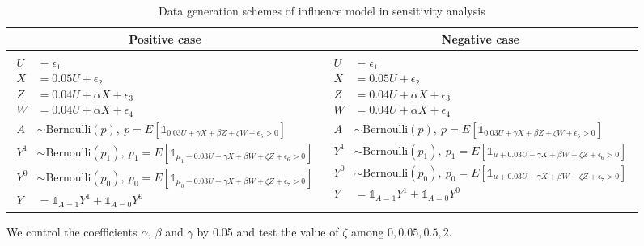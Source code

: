 \begin{table}[htbp]
    \centering
    \begin{tabular}{c|c}
        Positive case & Negative case \\
        \hline \\
        $\begin{aligned}
            U &= \epsilon_1 \\
            X &= 0.05U + \epsilon_2 \\
            Z &= 0.04U + \alpha X + \epsilon_3 \\
            W &= 0.04U + \alpha X + \epsilon_4 \\
            A &\sim \text{Bernoulli}(p),\ p=E[\mathds{1}_{0.03U + \gamma X + \beta Z + \zeta W + \epsilon_5 >0}] \\
            Y^1&\sim \text{Bernoulli}(p_1),\ p_1=E[\mathds{1}_{\mu_1 + 0.03U + \gamma X + \beta W + \zeta Z + \epsilon_6 > 0}] \\
            Y^0&\sim \text{Bernoulli}(p_0),\ p_0=E[\mathds{1}_{\mu_0 + 0.03U + \gamma X + \beta W + \zeta Z + \epsilon_7 > 0}] \\
            Y &= \mathds{1}_{A=1}Y^1 + \mathds{1}_{A=0}Y^0 
        \end{aligned}$ & 
        $\begin{aligned}
            U &= \epsilon_1 \\
            X &= 0.05U + \epsilon_2 \\
            Z &= 0.04U + \alpha X + \epsilon_3 \\
            W &= 0.04U + \alpha X + \epsilon_4 \\
            A &\sim \text{Bernoulli}(p),\ p=E[\mathds{1}_{0.03U + \gamma X + \beta Z + \zeta W + \epsilon_5 >0}] \\
            Y^1&\sim \text{Bernoulli}(p_1),\ p_1=E[\mathds{1}_{\mu + 0.03U + \gamma X + \beta W + \zeta Z + \epsilon_6 > 0}] \\
            Y^0&\sim \text{Bernoulli}(p_0),\ p_0=E[\mathds{1}_{\mu + 0.03U + \gamma X + \beta W + \zeta Z + \epsilon_7 > 0}] \\
            Y &= \mathds{1}_{A=1}Y^1 + \mathds{1}_{A=0}Y^0 
        \end{aligned}$
    \end{tabular}
    \caption{\centering Data generation schemes of influence model in sensitivity analysis}
    \label{tab: est_datageneration}
\end{table}

We control the coefficients $\alpha$, $\beta$ and $\gamma$ by 0.05 and test the value of $\zeta$ among $0, 0.05, 0.5, 2$.

